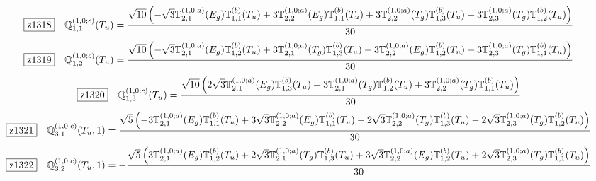 \documentclass[fleqn,10pt,landscape]{jsarticle}
\begin{document}
\begin{dmath*}
\hspace*{3mm}\fbox{z1318}\quad \mathbb{Q}_{1,1}^{(1,0;c)}(T_{u})=\frac{\sqrt{10} \left(- \sqrt{3} \mathbb{T}_{2,1}^{(1,0;a)}(E_{g}) \mathbb{T}_{1,1}^{(b)}(T_{u}) + 3 \mathbb{T}_{2,2}^{(1,0;a)}(E_{g}) \mathbb{T}_{1,1}^{(b)}(T_{u}) + 3 \mathbb{T}_{2,2}^{(1,0;a)}(T_{g}) \mathbb{T}_{1,3}^{(b)}(T_{u}) + 3 \mathbb{T}_{2,3}^{(1,0;a)}(T_{g}) \mathbb{T}_{1,2}^{(b)}(T_{u})\right)}{30}
\end{dmath*}
\begin{dmath*}
\hspace*{3mm}\fbox{z1319}\quad \mathbb{Q}_{1,2}^{(1,0;c)}(T_{u})=\frac{\sqrt{10} \left(- \sqrt{3} \mathbb{T}_{2,1}^{(1,0;a)}(E_{g}) \mathbb{T}_{1,2}^{(b)}(T_{u}) + 3 \mathbb{T}_{2,1}^{(1,0;a)}(T_{g}) \mathbb{T}_{1,3}^{(b)}(T_{u}) - 3 \mathbb{T}_{2,2}^{(1,0;a)}(E_{g}) \mathbb{T}_{1,2}^{(b)}(T_{u}) + 3 \mathbb{T}_{2,3}^{(1,0;a)}(T_{g}) \mathbb{T}_{1,1}^{(b)}(T_{u})\right)}{30}
\end{dmath*}
\begin{dmath*}
\hspace*{3mm}\fbox{z1320}\quad \mathbb{Q}_{1,3}^{(1,0;c)}(T_{u})=\frac{\sqrt{10} \left(2 \sqrt{3} \mathbb{T}_{2,1}^{(1,0;a)}(E_{g}) \mathbb{T}_{1,3}^{(b)}(T_{u}) + 3 \mathbb{T}_{2,1}^{(1,0;a)}(T_{g}) \mathbb{T}_{1,2}^{(b)}(T_{u}) + 3 \mathbb{T}_{2,2}^{(1,0;a)}(T_{g}) \mathbb{T}_{1,1}^{(b)}(T_{u})\right)}{30}
\end{dmath*}
\begin{dmath*}
\hspace*{3mm}\fbox{z1321}\quad \mathbb{Q}_{3,1}^{(1,0;c)}(T_{u},1)=\frac{\sqrt{5} \left(- 3 \mathbb{T}_{2,1}^{(1,0;a)}(E_{g}) \mathbb{T}_{1,1}^{(b)}(T_{u}) + 3 \sqrt{3} \mathbb{T}_{2,2}^{(1,0;a)}(E_{g}) \mathbb{T}_{1,1}^{(b)}(T_{u}) - 2 \sqrt{3} \mathbb{T}_{2,2}^{(1,0;a)}(T_{g}) \mathbb{T}_{1,3}^{(b)}(T_{u}) - 2 \sqrt{3} \mathbb{T}_{2,3}^{(1,0;a)}(T_{g}) \mathbb{T}_{1,2}^{(b)}(T_{u})\right)}{30}
\end{dmath*}
\begin{dmath*}
\hspace*{3mm}\fbox{z1322}\quad \mathbb{Q}_{3,2}^{(1,0;c)}(T_{u},1)=- \frac{\sqrt{5} \left(3 \mathbb{T}_{2,1}^{(1,0;a)}(E_{g}) \mathbb{T}_{1,2}^{(b)}(T_{u}) + 2 \sqrt{3} \mathbb{T}_{2,1}^{(1,0;a)}(T_{g}) \mathbb{T}_{1,3}^{(b)}(T_{u}) + 3 \sqrt{3} \mathbb{T}_{2,2}^{(1,0;a)}(E_{g}) \mathbb{T}_{1,2}^{(b)}(T_{u}) + 2 \sqrt{3} \mathbb{T}_{2,3}^{(1,0;a)}(T_{g}) \mathbb{T}_{1,1}^{(b)}(T_{u})\right)}{30}
\end{dmath*}
\end{document}
